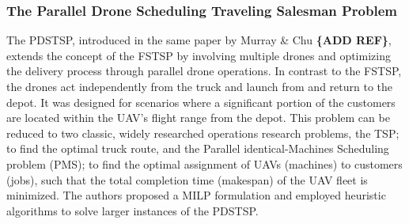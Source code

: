 \documentclass{article}
\begin{document}
	
	\subsubsection{The Parallel Drone Scheduling Traveling Salesman Problem}
	 The PDSTSP, introduced in the same paper by Murray \& Chu \textbf{\{ADD REF\}}, extends the concept of the FSTSP by involving multiple drones and optimizing the delivery process through parallel drone operations. In contrast to the FSTSP, the drones act independently from the truck and launch from and return to the depot. It was designed for scenarios where a significant portion of the customers are located within the UAV's flight range from the depot. This problem can be reduced to two classic, widely researched operations research problems, the TSP; to find the optimal truck route, and the Parallel identical-Machines Scheduling problem (PMS); to find the optimal assignment of UAVs (machines) to customers (jobs), such that the total completion time (makespan) of the UAV fleet is minimized. The authors proposed a MILP formulation and employed heuristic algorithms to solve larger instances of the PDSTSP.
\end{document}
